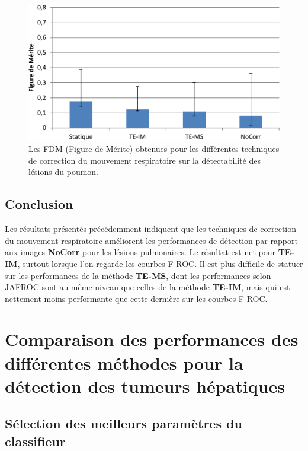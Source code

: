 \begin{figure}[h!]
 \begin{center}
   \includegraphics[width=13cm]{images/FOM_mod}
 \end{center}
 \caption{Les FDM (Figure de Mérite) obtenues pour les différentes techniques de correction du mouvement respiratoire sur la détectabilité des lésions du poumon.}
 \label{fig:fom_mod}
\end{figure}

\subsection{Conclusion}

Les résultats présentés précédemment indiquent que les techniques de correction du mouvement respiratoire améliorent les performances de détection par rapport aux images \textbf{NoCorr} pour les lésions pulmonaires. Le résultat est net pour \textbf{TE-IM}, surtout lorsque l'on regarde les courbes F-ROC. Il est plus difficile de statuer sur les performances de la méthode \textbf{TE-MS}, dont les performances selon JAFROC sont au même niveau que celles de la méthode \textbf{TE-IM}, mais qui est nettement moins performante que cette dernière sur les courbes F-ROC.


\FloatBarrier

\section{Comparaison des performances des différentes méthodes pour la détection des tumeurs hépatiques}


\subsection{Sélection des meilleurs paramètres du classifieur}

